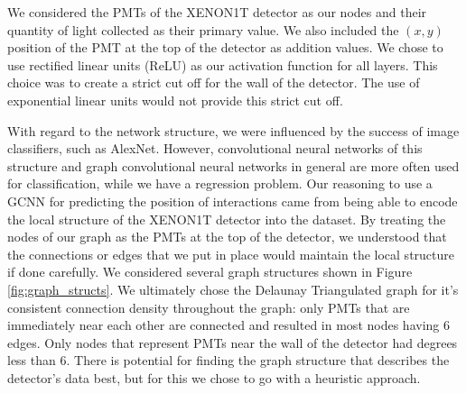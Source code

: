 \documentclass[thesis.tex]{subfiles}
\begin{document}
\par We considered the PMTs of the XENON1T detector as our nodes and their quantity of light collected as their primary value.
We also included the $(x,y)$ position of the PMT at the top of the detector as addition values.
We chose to use rectified linear units (ReLU) as our activation function for all layers.
This choice was to create a strict cut off for the wall of the detector.
The use of exponential linear units would not provide this strict cut off.

\par With regard to the network structure, we were influenced by the success of image classifiers, such as AlexNet.
However, convolutional neural networks of this structure and graph convolutional neural networks in general are more often used for classification, while we have a regression problem.
Our reasoning to use a GCNN for predicting the position of interactions came from being able to encode the local structure of the XENON1T detector into the dataset.
By treating the nodes of our graph as the PMTs at the top of the detector, we understood that the connections or edges that we put in place would maintain the local structure if done carefully.
We considered several graph structures shown in Figure \ref{fig:graph_structs}.
We ultimately chose the Delaunay Triangulated graph for it's consistent connection density throughout the graph: only PMTs that are immediately near each other are connected and resulted in most nodes having 6 edges.
Only nodes that represent PMTs near the wall of the detector had degrees less than 6.
There is potential for finding the graph structure that describes the detector's data best, but for this we chose to go with a heuristic approach.
\end{document}
